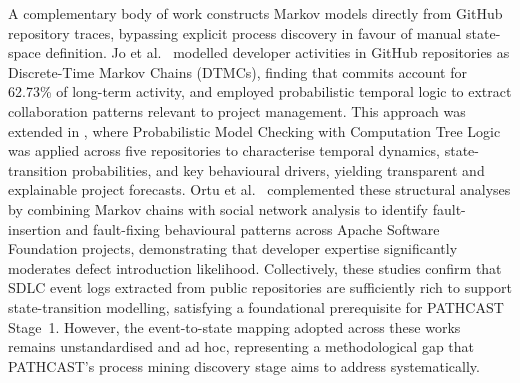 
A complementary body of work constructs Markov models directly from GitHub repository traces, bypassing explicit process discovery in favour of manual state-space definition. Jo et al.\ \cite{jo2023} modelled developer activities in GitHub repositories as Discrete-Time Markov Chains (DTMCs), finding that commits account for 62.73\% of long-term activity, and employed probabilistic temporal logic to extract collaboration patterns relevant to project management. This approach was extended in \cite{jo2024}, where Probabilistic Model Checking with Computation Tree Logic was applied across five repositories to characterise temporal dynamics, state-transition probabilities, and key behavioural drivers, yielding transparent and explainable project forecasts. Ortu et al.\ \cite{ortu2023} complemented these structural analyses by combining Markov chains with social network analysis to identify fault-insertion and fault-fixing behavioural patterns across Apache Software Foundation projects, demonstrating that developer expertise significantly moderates defect introduction likelihood. Collectively, these studies confirm that SDLC event logs extracted from public repositories are sufficiently rich to support state-transition modelling, satisfying a foundational prerequisite for PATHCAST Stage~1. However, the event-to-state mapping adopted across these works remains unstandardised and ad hoc, representing a methodological gap that PATHCAST's process mining discovery stage aims to address systematically.



